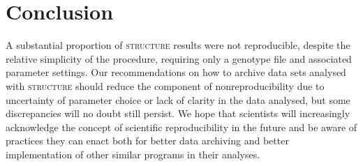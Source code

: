 \section{Conclusion}
A substantial proportion of \textsc{structure} results were not reproducible, despite the relative simplicity of 
the procedure, requiring only a genotype file and associated parameter settings. Our recommendations on how to 
archive data sets analysed with \textsc{structure} should reduce the component of nonreproducibility due to 
uncertainty of parameter choice or lack of clarity in the data analysed, but some discrepancies will no 
doubt still persist. We hope that scientists will increasingly acknowledge the concept of scientific 
reproducibility in the future and be aware of practices they can enact both for better data archiving 
and better implementation of other similar programs in their analyses.

